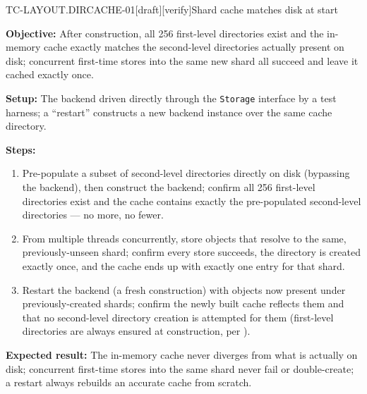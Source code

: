 \begin{requirement}{TC-LAYOUT.DIRCACHE-01}[draft][verify]{Shard cache matches disk at start}


  \textbf{Objective:} After construction, all 256 first-level directories
  exist and the in-memory cache exactly matches the second-level
  directories actually present on disk; concurrent first-time stores into
  the same new shard all succeed and leave it cached exactly once.

  \textbf{Setup:} The backend driven directly through the \texttt{Storage}
  interface by a test harness; a ``restart'' constructs a new backend instance
  over the same cache directory.

  \textbf{Steps:}
  \begin{enumerate}
    \item Pre-populate a subset of second-level directories directly on
      disk (bypassing the backend), then construct the backend; confirm
      all 256 first-level directories exist and the cache contains exactly
      the pre-populated second-level directories --- no more, no fewer.
    \item From multiple threads concurrently, store objects that resolve
      to the same, previously-unseen shard; confirm every store succeeds,
      the directory is created exactly once, and the cache ends up with
      exactly one entry for that shard.
    \item Restart the backend (a fresh construction) with objects now
      present under previously-created shards; confirm the newly built
      cache reflects them and that no second-level directory creation is
      attempted for them (first-level directories are always ensured at
      construction, per ).
  \end{enumerate}

  \textbf{Expected result:} The in-memory cache never diverges from what
  is actually on disk; concurrent first-time stores into the same shard
  never fail or double-create; a restart always rebuilds an accurate cache
  from scratch.



\end{requirement}

